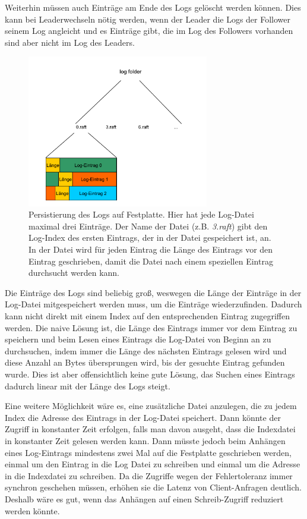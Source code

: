 Weiterhin müssen auch Einträge am Ende des Logs gelöscht werden können. Dies kann bei Leaderwechseln nötig werden, wenn der Leader die Logs der Follower seinem Log angleicht und es Einträge gibt, die im Log des Followers vorhanden sind aber nicht im Log des Leaders.

\begin{figure}[h]
	\centering
	\includegraphics[width=300px]{img/log-files}
	\caption{Persistierung des Logs auf Festplatte. Hier hat jede Log-Datei maximal drei Einträge. Der Name der Datei (z.B. \textit{3.raft}) gibt den Log-Index des ersten Eintrags, der in der Datei gespeichert ist, an. In der Datei wird für jeden Eintrag die Länge des Eintrags vor den Eintrag geschrieben, damit die Datei nach einem speziellen Eintrag durchsucht werden kann.}
	\label{fig:log-files}
\end{figure}

Die Einträge des Logs sind beliebig groß, weswegen die Länge der Einträge in der Log-Datei mitgespeichert werden muss, um die Einträge wiederzufinden. Dadurch kann nicht direkt mit einem Index auf den entsprechenden Eintrag zugegriffen werden. Die naive Lösung ist, die Länge des Eintrags immer vor dem Eintrag zu speichern und beim Lesen eines Eintrags die Log-Datei von Beginn an zu durchsuchen, indem immer die Länge des nächsten Eintrags gelesen wird und diese Anzahl an Bytes übersprungen wird, bis der gesuchte Eintrag gefunden wurde. Dies ist aber offensichtlich keine gute Lösung, das Suchen eines Eintrags dadurch linear mit der Länge des Logs steigt.

Eine weitere Möglichkeit wäre es, eine zusätzliche Datei anzulegen, die zu jedem Index die Adresse des Eintrags in der Log-Datei speichert. Dann könnte der Zugriff in konstanter Zeit erfolgen, falls man davon ausgeht, dass die Indexdatei in konstanter Zeit gelesen werden kann. Dann müsste jedoch beim Anhängen eines Log-Eintrags mindestens zwei Mal auf die Festplatte geschrieben werden, einmal um den Eintrag in die Log Datei zu schreiben und einmal um die Adresse in die Indexdatei zu schreiben. Da die Zugriffe wegen der Fehlertoleranz immer synchron geschehen müssen, erhöhen sie die Latenz von Client-Anfragen deutlich. Deshalb wäre es gut, wenn das Anhängen auf einen Schreib-Zugriff reduziert werden könnte.

